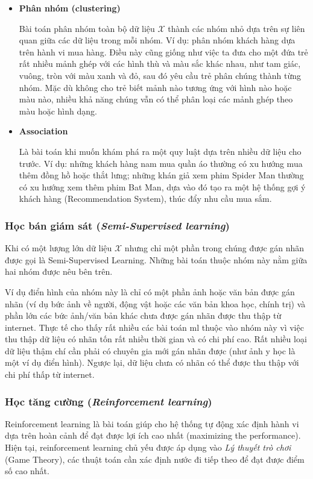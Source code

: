 \documentclass[../main-report.tex]{subfiles}
\begin{document}
\begin{itemize}
\item \textbf{Phân nhóm (clustering)}

Bài toán phân nhóm toàn bộ dữ liệu \(\mathcal{X}\) thành các nhóm nhỏ dựa trên sự liên quan giữa các dữ liệu trong mỗi nhóm. Ví dụ: phân nhóm khách hàng dựa trên hành vi mua hàng. Điều này cũng giống như việc ta đưa cho một đứa trẻ rất nhiều mảnh ghép với các hình thù và màu sắc khác nhau, như tam giác, vuông, tròn với màu xanh và đỏ, sau đó yêu cầu trẻ phân chúng thành từng nhóm. Mặc dù không cho trẻ biết mảnh nào tương ứng với hình nào hoặc màu nào, nhiều khả năng chúng vẫn có thể phân loại các mảnh ghép theo màu hoặc hình dạng.

\item \textbf{Association}

Là bài toán khi muốn khám phá ra một quy luật dựa trên nhiều dữ liệu cho trước. Ví dụ: những khách hàng nam mua quần áo thường có xu hướng mua thêm đồng hồ hoặc thắt lưng; những khán giả xem phim Spider Man thường có xu hướng xem thêm phim Bat Man, dựa vào đó tạo ra một hệ thống gợi ý khách hàng (Recommendation System), thúc đẩy nhu cầu mua sắm.
\end{itemize}

\subsubsection{Học bán giám sát (\emph{Semi-Supervised learning})}
Khi có một lượng lớn dữ liệu \(\mathcal{X}\) nhưng chỉ một phần trong chúng được gán nhãn được gọi là Semi-Supervised Learning. Những bài toán thuộc nhóm này nằm giữa hai nhóm được nêu bên trên.

Ví dụ điển hình của nhóm này là chỉ có một phần ảnh hoặc văn bản được gán nhãn (ví dụ bức ảnh về người, động vật hoặc các văn bản khoa học, chính trị) và phần lớn các bức ảnh/văn bản khác chưa được gán nhãn được thu thập từ internet. Thực tế cho thấy rất nhiều các bài toán \gls{ml} thuộc vào nhóm này vì việc thu thập dữ liệu có nhãn tốn rất nhiều thời gian và có chi phí cao. Rất nhiều loại dữ liệu thậm chí cần phải có chuyên gia mới gán nhãn được (như ảnh y học là một ví dụ điển hình). Ngược lại, dữ liệu chưa có nhãn có thể được thu thập với chi phí thấp từ internet.

\subsubsection{Học tăng cường (\emph{Reinforcement learning})}
Reinforcement learning là bài toán giúp cho hệ thống tự động xác định hành vi dựa trên hoàn cảnh để đạt được lợi ích cao nhất (maximizing the performance). Hiện tại, reinforcement learning chủ yếu được áp dụng vào \emph{Lý thuyết trò chơi} (Game Theory), các thuật toán cần xác định nước đi tiếp theo để đạt được điểm số cao nhất.
\end{document}
